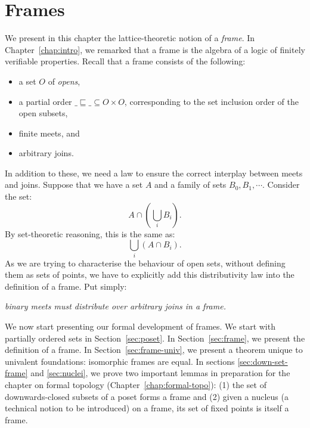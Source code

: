 \chapter{Frames}\label{chap:frames}

We present in this chapter the lattice-theoretic notion of a \emph{frame}. In
Chapter~\ref{chap:intro}, we remarked that a frame is the algebra of a logic of finitely
verifiable properties. Recall that a frame consists of the following:
\begin{itemize}
  \item a set $O$ of \emph{opens},
  \item a partial order $\_\sqsubseteq\_ \subseteq O \times O$, corresponding to the set inclusion order of the
    open subsets,
  \item finite meets, and
  \item arbitrary joins.
\end{itemize}

In addition to these, we need a law to ensure the correct interplay between meets and
joins. Suppose that we have a set $A$ and a family of sets $B_0, B_1, \cdots$. Consider the
set:
\begin{equation*}
  A \cap (\bigcup_i B_i).
\end{equation*}
By set-theoretic reasoning, this is the same as:
\begin{equation*}
  \bigcup_i (A \cap B_i).
\end{equation*}
As we are trying to characterise the behaviour of open sets, without defining them as sets
of points, we have to explicitly add this distributivity law into the definition of a
frame. Put simply:
\begin{center}
  \emph{binary meets must distribute over arbitrary joins in a frame.}
\end{center}

We now start presenting our formal development of frames. We start with partially ordered
sets in Section~\ref{sec:poset}. In Section~\ref{sec:frame}, we present the definition of
a frame. In Section~\ref{sec:frame-univ}, we present a theorem unique to univalent
foundations: isomorphic frames are equal. In sections \ref{sec:down-set-frame} and
\ref{sec:nuclei}, we prove two important lemmas in preparation for the chapter on formal
topology (Chapter~\ref{chap:formal-topo}): (1) the set of downwards-closed subsets of a
poset forms a frame and (2) given a nucleus (a technical notion to be introduced) on a
frame, its set of fixed points is itself a frame.

